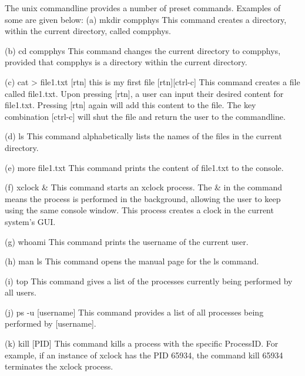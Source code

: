 The unix commandline provides a number of preset commands. Examples of some are given below:
(a) mkdir compphys
This command creates a directory, within the current directory, called compphys.

(b) cd compphys
This command changes the current directory to compphys, provided that compphys is
a directory within the current directory.

(c) cat > file1.txt [rtn] this is my first file [rtn][ctrl-c]
This command creates a file called file1.txt. Upon pressing [rtn], a user can input
their desired content for file1.txt. Pressing [rtn] again will add this content to
the file. The key combination [ctrl-c] will shut the file and return the user to
the commandline.

(d) ls
This command alphabetically lists the names of the files in the current directory.

(e) more file1.txt
This command prints the content of file1.txt to the console.

(f) xclock &
This command starts an xclock process. The & in the command means the process is performed
in the background, allowing the user to keep using the same console window. This process
creates a clock in the current system's GUI.

(g) whoami
This command prints the username of the current user.

(h) man ls
This command opens the manual page for the ls command.

(i) top
This command gives a list of the processes currently being performed by all users.

(j) ps -u [username]
This command provides a list of all processes being performed by [username].

(k) kill [PID]
This command kills a process with the specific ProcessID.
For example, if an instance of xclock has the PID 65934, the command kill 65934
terminates the xclock process.